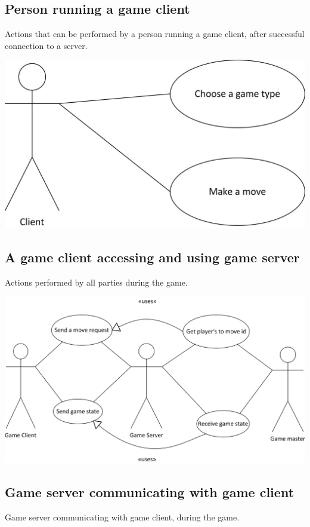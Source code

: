 \documentclass{article}
\begin{document}
\subsection{Person running a game client}
Actions that can be performed by a person running a game client, after successful connection to a server.

\includegraphics[scale=1.00]{UGS_usecases_client.jpg}


\pagebreak[4]


\subsection{A game client accessing and using game server}
Actions performed by all parties during the game.

\includegraphics[scale=1.20]{UGS_usecases_application-client,server,master.jpg}

\subsection{Game server communicating with game client}
Game server communicating with game client, during the game.
 
\end{document}
